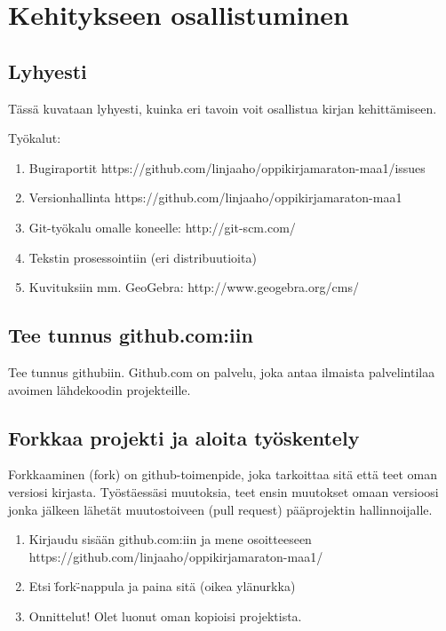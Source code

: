 \chapter{Kehitykseen osallistuminen}

\section{Lyhyesti}

Tässä kuvataan lyhyesti, kuinka eri tavoin voit osallistua kirjan kehittämiseen.

Työkalut:

\begin{enumerate}

\item Bugiraportit https://github.com/linjaaho/oppikirjamaraton-maa1/issues
\item Versionhallinta https://github.com/linjaaho/oppikirjamaraton-maa1
\item Git-työkalu omalle koneelle: http://git-scm.com/
\item Tekstin prosessointiin \latex (eri distribuutioita)
\item Kuvituksiin mm. GeoGebra: http://www.geogebra.org/cms/

\end{enumerate}

\section{Tee tunnus github.com:iin}

Tee tunnus githubiin. Github.com on palvelu, joka antaa ilmaista palvelintilaa avoimen lähdekoodin projekteille.


\section{Forkkaa projekti ja aloita työskentely}

Forkkaaminen (fork) on github-toimenpide, joka tarkoittaa sitä että teet oman versiosi kirjasta. Työstäessäsi muutoksia, teet ensin muutokset omaan versioosi jonka jälkeen lähetät muutostoiveen (pull request) pääprojektin hallinnoijalle.

\begin{enumerate}

\item Kirjaudu sisään github.com:iin ja mene osoitteeseen https://github.com/linjaaho/oppikirjamaraton-maa1/
\item Etsi \"fork\" -nappula ja paina sitä (oikea ylänurkka)
\item Onnittelut! Olet luonut oman kopioisi projektista. 

\end{enumerate}

